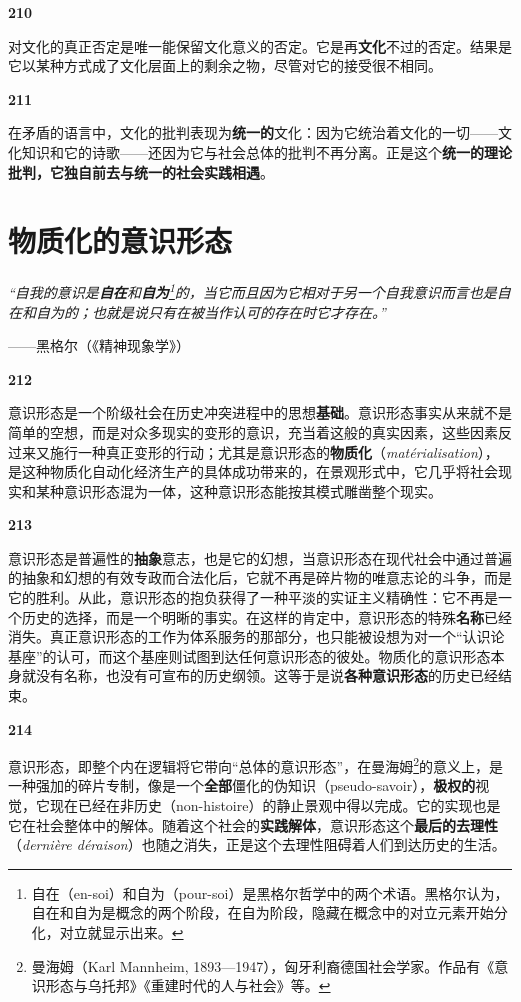 \documentclass[fontset=fandol, a4paper, 12pt, openright]{ctexbook}
\makeatletter
\renewenvironment{quote}
  {\list{}{\rightmargin\leftmargin}%
   \item\relax\small\itshape\color{darkgray}}
  {\endlist}
\newcommand{\thesis}[1]{%
    \par\vspace{1.5em}%
    {\centering \textbf{\Large #1}\par}%
    \nobreak\vspace{0.5em}\nobreak
    \@afterindenttrue %
    \@afterheading    %
}
\makeatother
\begin{document}
\thesis{210}
对文化的真正否定是唯一能保留文化意义的否定。它是再\textbf{文化}不过的否定。结果是它以某种方式成了文化层面上的剩余之物，尽管对它的接受很不相同。

\thesis{211}
在矛盾的语言中，文化的批判表现为\textbf{统一的}文化：因为它统治着文化的一切——文化知识和它的诗歌——还因为它与社会总体的批判不再分离。正是这个\textbf{统一的理论批判，它独自前去与统一的社会实践相遇}。


\chapter{物质化的意识形态}

\begin{quote}
“自我的意识是\textbf{自在}和\textbf{自为}\footnote{自在（en-soi）和自为（pour-soi）是黑格尔哲学中的两个术语。黑格尔认为，自在和自为是概念的两个阶段，在自为阶段，隐藏在概念中的对立元素开始分化，对立就显示出来。}的，当它而且因为它相对于另一个自我意识而言也是自在和自为的；也就是说只有在被当作认可的存在时它才存在。”

\begin{flushright}
——黑格尔（《精神现象学》）
\end{flushright}
\end{quote}

\thesis{212}
意识形态是一个阶级社会在历史冲突进程中的思想\textbf{基础}。意识形态事实从来就不是简单的空想，而是对众多现实的变形的意识，充当着这般的真实因素，这些因素反过来又施行一种真正变形的行动；尤其是意识形态的\textbf{物质化}（\textit{matérialisation}），是这种物质化自动化经济生产的具体成功带来的，在景观形式中，它几乎将社会现实和某种意识形态混为一体，这种意识形态能按其模式雕凿整个现实。

\thesis{213}
意识形态是普遍性的\textbf{抽象}意志，也是它的幻想，当意识形态在现代社会中通过普遍的抽象和幻想的有效专政而合法化后，它就不再是碎片物的唯意志论的斗争，而是它的胜利。从此，意识形态的抱负获得了一种平淡的实证主义精确性：它不再是一个历史的选择，而是一个明晰的事实。在这样的肯定中，意识形态的特殊\textbf{名称}已经消失。真正意识形态的工作为体系服务的那部分，也只能被设想为对一个“认识论基座”的认可，而这个基座则试图到达任何意识形态的彼处。物质化的意识形态本身就没有名称，也没有可宣布的历史纲领。这等于是说\textbf{各种意识形态}的历史已经结束。

\thesis{214}
意识形态，即整个内在逻辑将它带向“总体的意识形态”，在曼海姆\footnote{曼海姆（Karl Mannheim, 1893—1947），匈牙利裔德国社会学家。作品有《意识形态与乌托邦》《重建时代的人与社会》等。}的意义上，是一种强加的碎片专制，像是一个\textbf{全部}僵化的伪知识（pseudo-savoir），\textbf{极权的}视觉，它现在已经在非历史（non-histoire）的静止景观中得以完成。它的实现也是它在社会整体中的解体。随着这个社会的\textbf{实践解体}，意识形态这个\textbf{最后的去理性}（\textit{dernière déraison}）也随之消失，正是这个去理性阻碍着人们到达历史的生活。
\end{document}
